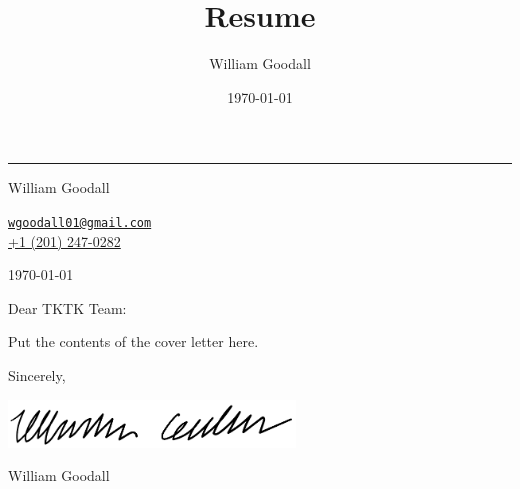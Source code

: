 \documentclass[letterpaper,12pt]{article}
\title{Resume}
\author{William Goodall}
\date{\today}
\begin{document}
\pagestyle{empty}


\hrule\vbeat\vbeat

{\large{}William Goodall}
	
\href{mailto:wgoodall01@gmail.com}{\tt wgoodall01@gmail.com}\\
\href{tel:2012470282}{+1 (201) 247-0282}

\vbeat\vbeat

\today

\vbeat\vbeat

Dear TKTK Team:

Put the contents of the cover letter here.

\vbeat\vbeat

Sincerely,

\includegraphics[width=3in]{signature.pdf}

William Goodall
\end{document}
